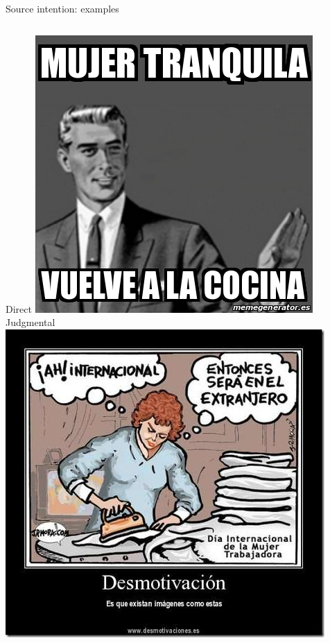 \begin{frame}{Source intention: examples}
\begin{columns}
    \centering
    Direct
    \includegraphics[width=\textwidth]{images/110070.jpeg}
    \centering
    Judgmental
    \includegraphics[width=\textwidth]{images/110015.jpeg}
\end{columns}
\end{frame}


